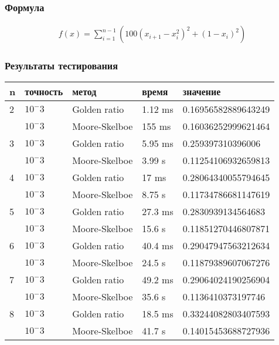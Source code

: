 \documentclass{article}
\begin{document}
    \subsubsection{Формула}
    \begin{gather*}
        f(x)=\sum_{i=1}^{n-1}\left(100\left(x_{i+1}-x_i^2\right)^2+\left(1-x_i\right)^2\right)
    \end{gather*}

    \subsubsection{Результаты тестирования}

    \begin{tabular}{ |p{2cm}|p{2cm}|p{3cm}|p{2cm}|p{4cm}|  }
        \hline
        n & точность & метод         & время   & значение            \\
        \hline
        2 & $10^-3$  & Golden ratio  & 1.12 ms & 0.16956582889643249 \\\cline{2-5}
        & $10^-3$  & Moore-Skelboe & 155 ms  & 0.16036252999621464 \\
        \hline
        3 & $10^-3$  & Golden ratio  & 5.95 ms & 0.259397310396006   \\\cline{2-5}
        & $10^-3$  & Moore-Skelboe & 3.99 s  & 0.11254106932659813 \\
        \hline
        4 & $10^-3$  & Golden ratio  & 17 ms   & 0.28064340055794645 \\\cline{2-5}
        & $10^-3$  & Moore-Skelboe & 8.75 s  & 0.11734786681147619 \\
        \hline
        5 & $10^-3$  & Golden ratio  & 27.3 ms & 0.2830939134564683  \\\cline{2-5}
        & $10^-3$  & Moore-Skelboe & 15.6 s  & 0.11851270446807871 \\
        \hline
        6 & $10^-3$  & Golden ratio  & 40.4 ms & 0.29047947563212634 \\\cline{2-5}
        & $10^-3$  & Moore-Skelboe & 24.5 s  & 0.11879389607067276 \\
        \hline
        7 & $10^-3$  & Golden ratio  & 49.2 ms & 0.29064024190256904 \\\cline{2-5}
        & $10^-3$  & Moore-Skelboe & 35.6 s  & 0.1136410373197746  \\
        \hline
        8 & $10^-3$  & Golden ratio  & 18.5 ms & 0.33244082803407593 \\\cline{2-5}
        & $10^-3$  & Moore-Skelboe & 41.7 s  & 0.14015453688727936 \\
        \hline

    \end{tabular}
\end{document}
